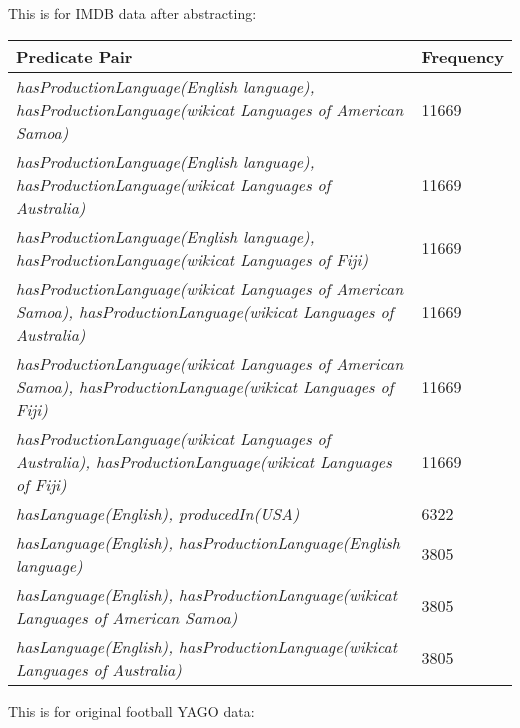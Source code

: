 \documentclass{acm_proc_article-sp}
\begin{document}
This is for IMDB data after abstracting:

\begin{center}
\begin{tabular}{ |p{6cm}|p{1.5cm}| } 
\hline
Predicate Pair & Frequency\\
\hline
\textit{hasProductionLanguage(English language), hasProductionLanguage(wikicat Languages of American Samoa)} & 11669 \\
\hline
\textit{hasProductionLanguage(English language), hasProductionLanguage(wikicat Languages of Australia)} & 11669 \\
\hline
\textit{hasProductionLanguage(English language), hasProductionLanguage(wikicat Languages of Fiji)} & 11669 \\
\hline
\textit{hasProductionLanguage(wikicat Languages of American Samoa), hasProductionLanguage(wikicat Languages of Australia)} & 11669 \\
\hline
\textit{hasProductionLanguage(wikicat Languages of American Samoa), hasProductionLanguage(wikicat Languages of Fiji)} & 11669 \\
\hline
\textit{hasProductionLanguage(wikicat Languages of Australia), hasProductionLanguage(wikicat Languages of Fiji)} & 11669 \\
\hline
\textit{hasLanguage(English), producedIn(USA)} & 6322 \\
\hline
\textit{hasLanguage(English), hasProductionLanguage(English language)} & 3805 \\
\hline
\textit{hasLanguage(English), hasProductionLanguage(wikicat Languages of American Samoa)} & 3805 \\
\hline
\textit{hasLanguage(English), hasProductionLanguage(wikicat Languages of Australia)} & 3805 \\
\hline
\end{tabular}
\end{center}

This is for original football YAGO data:
\end{document}
